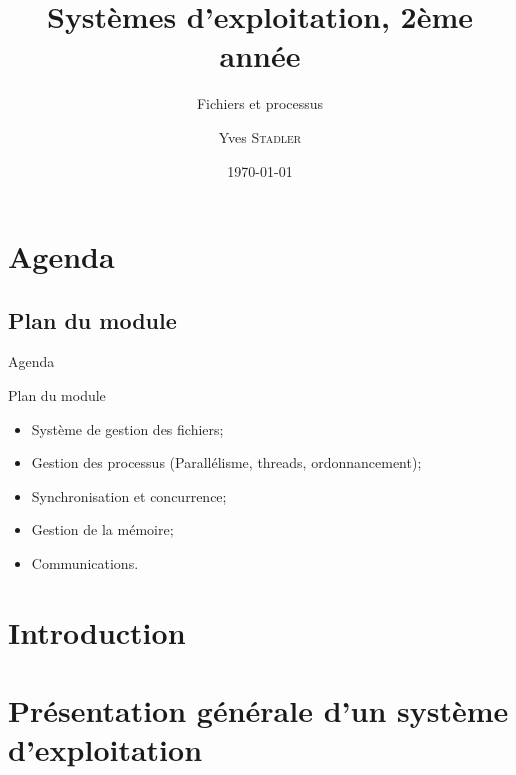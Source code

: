
\title{Systèmes d'exploitation, 2ème année}
\subtitle{Fichiers et processus}

\author{Yves \textsc{Stadler}}

\date{\today}




\begin{frame}
\titlepage
\end{frame}

\def\sectitle{Agenda}
\section{\sectitle}
\def\subsectitle{Plan du module}
\subsection{\subsectitle}

\begin{frame}{\sectitle}
\begin{block}{\subsectitle}
\begin{itemize}
\item Système de gestion des fichiers;
\item Gestion des processus (Parallélisme, threads, ordonnancement);
\item Synchronisation et concurrence;
\item Gestion de la mémoire;
\item Communications.
\end{itemize}
\end{block}
\end{frame}

\def\sectitle{Introduction}
\section{\sectitle}




\def\sectitle{Présentation générale d'un système d'exploitation}
\section{\sectitle}


